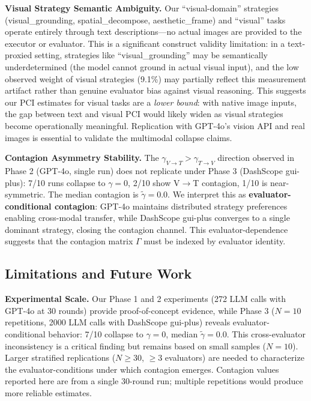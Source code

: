 \documentclass[11pt,a4paper]{article}
\begin{document}
\textbf{Visual Strategy Semantic Ambiguity.} Our ``visual-domain'' strategies (visual\_grounding, spatial\_decompose, aesthetic\_frame) and ``visual'' tasks operate entirely through text descriptions---no actual images are provided to the executor or evaluator. This is a significant construct validity limitation: in a text-proxied setting, strategies like ``visual\_grounding'' may be semantically underdetermined (the model cannot ground in actual visual input), and the low observed weight of visual strategies (9.1\%) may partially reflect this measurement artifact rather than genuine evaluator bias against visual reasoning. This suggests our PCI estimates for visual tasks are a \textit{lower bound}: with native image inputs, the gap between text and visual PCI would likely widen as visual strategies become operationally meaningful. Replication with GPT-4o's vision API and real images is essential to validate the multimodal collapse claims.

\textbf{Contagion Asymmetry Stability.} The $\gamma_{V\to T} > \gamma_{T\to V}$ direction observed in Phase 2 (GPT-4o, single run) does not replicate under Phase 3 (DashScope gui-plus): 7/10 runs collapse to $\gamma=0$, 2/10 show V$\to$T contagion, 1/10 is near-symmetric. The median contagion is $\tilde{\gamma}=0.0$. We interpret this as \textbf{evaluator-conditional contagion}: GPT-4o maintains distributed strategy preferences enabling cross-modal transfer, while DashScope gui-plus converges to a single dominant strategy, closing the contagion channel. This evaluator-dependence suggests that the contagion matrix $\Gamma$ must be indexed by evaluator identity.

\subsection{Limitations and Future Work}

\textbf{Experimental Scale.} Our Phase 1 and 2 experiments (272 LLM calls with GPT-4o at 30 rounds) provide proof-of-concept evidence, while Phase 3 ($N=10$ repetitions, 2000 LLM calls with DashScope gui-plus) reveals evaluator-conditional behavior: 7/10 collapse to $\gamma=0$, median $\tilde{\gamma}=0.0$. This cross-evaluator inconsistency is a critical finding but remains based on small samples ($N=10$). Larger stratified replications ($N \geq 30$, $\geq 3$ evaluators) are needed to characterize the evaluator-conditions under which contagion emerges. Contagion values reported here are from a single 30-round run; multiple repetitions would produce more reliable estimates.
\end{document}
